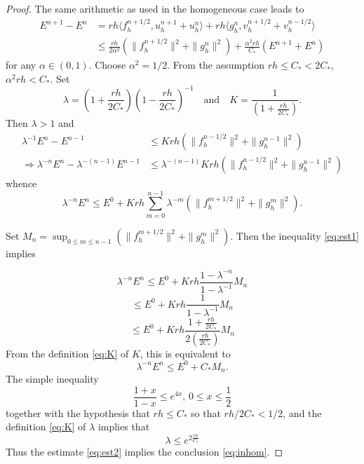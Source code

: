 \begin{proof}
The same arithmetic as used in the homogeneous case leads to
\begin{equation*}
\begin{split}
	E^{n+1}-E^n 
	&= rh\langle f^{n+1/2}_h, u^{n+1}_h+u^n_h\rangle + rh\langle g^n_h,
v^{n+1/2}_h+v^{n-1/2}_h\rangle\\
	&\le \frac{rh}{2\alpha^2} (\|f^{n+1/2}_h\|^2 + \|g^n_h\|^2) +
\frac{\alpha^2rh}{C_*}(E^{n+1}+E^n)
\end{split}
\end{equation*}
for any $\alpha \in (0,1)$. Choose $\alpha^2=1/2$. From the assumption $rh \le C_* <2C_*$,
$\alpha^2 rh < C_*$. Set 
\begin{equation}\label{eq:K}
	\lambda = \left(1+\frac{rh}{2C_*}\right) \left(1-\frac{rh}{2C_*}\right)^{-1}
	\quad
	\text{and}
	\quad
	K = \frac{1}{ \left(1+\frac{rh}{2C_*}\right) }.
\end{equation}
Then $\lambda > 1$ and 
\begin{equation*}
\begin{split}
	\lambda^{-1}E^{n} - E^{n-1} &\le Krh (\|f^{n-1/2}_h\|^2 + \|g^{n-1}_h\|^2)  \\
	\Longrightarrow
	\lambda^{-n}E^{n} - \lambda^{-(n-1)}E^{n-1} &\le \lambda^{-(n-1)}Krh (\|f^{n-1/2}_h\|^2 + \|g^{n-1}_h\|^2) 
\end{split}
\end{equation*}
whence
\begin{equation}
\label{eq:est1}
\lambda^{-n}E^n \le E^0 +
Krh\sum_{m=0}^{n-1}\lambda^{-m}(\|f^{m+1/2}_h\|^2 + \|g^m_h\|^2). 
\end{equation}

Set $M_n=\sup_{0 \le m \le n-1}(\|f^{m+1/2}_h\|^2 +
\|g^m_h\|^2)$. Then the inequality \ref{eq:est1} implies 

\[
\lambda^{-n}E^n \le E^0 +
Krh \frac{1-\lambda^{-n}}{1-\lambda^{-1}} M_n
\]
\[
\le E^0 + Krh\frac{1}{1-\lambda^{-1}} M_n
\]
\[
\le E^0 + Krh \frac{1 + \frac{rh}{2C_*}}{2\left(
    \frac{rh}{2C_*}\right)}M_n
\]
From the definition \ref{eq:K} of $K$, this is equivalent to 
\begin{equation}
\label{eq:est2}
\lambda^{-n}E^n \le E^0 + C_* M_n.
\end{equation}
The simple inequality 
\[
\frac{1+x}{1-x} \le e^{4x},\, 0\le x \le \frac{1}{2}
\]
together with the hypothesis that $rh \le C_*$ so that $rh/2C_* < 1/2$, and the definition
\ref{eq:K} of $\lambda$ implies that 
\[
\lambda \le e^{2\frac{rh}{C_*}}
\]
Thus the estimate \ref{eq:est2} implies the conclusion \ref{eq:inhom}.
\end{proof}

